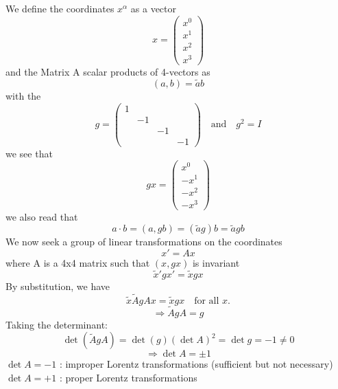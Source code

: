 \documentclass{article}
\begin{document}
	We define the coordinates $x^\alpha$ as a vector
	\[
	x = \begin{pmatrix} x^0 \\ x^1 \\ x^2 \\ x^3 \end{pmatrix}
	\]
	and the Matrix A scalar products of 4-vectors as
	\[
	(a, b) = \tilde{a}b
	\]
	with the
	\[
	g = \begin{pmatrix} 1 & & & \\ & -1 & & \\ & & -1 & \\ & & & -1 \end{pmatrix}
	\quad \text{and} \quad g^2 = I
	\]
	we see that
	\[
	gx = \begin{pmatrix} x^0 \\ -x^1 \\ -x^2 \\ -x^3 \end{pmatrix}
	\]
	we also read that
	\[
	a \cdot b = (a, gb) = (\tilde{a}g)b = \tilde{a}gb
	\]
	We now seek a group of linear transformations on the coordinates
	\[
	x' = Ax
	\]
	where A is a 4x4 matrix such that $(x, gx)$ is invariant
	\[
	\tilde{x}'g x' = \tilde{x}gx
	\]
	By substitution, we have
	\[
	\tilde{x} \tilde{A} g A x = \tilde{x} g x \quad \text{for all } x.
	\]
	\[
	\Rightarrow \tilde{A} g A = g
	\]
	Taking the determinant:
	\[
	\det(\tilde{A} g A) = \det(g) (\det A)^2 = \det g = -1 \neq 0
	\]
	\[
	\Rightarrow \det A = \pm 1
	\]
	$\det A = -1$ : improper Lorentz transformations (sufficient but not necessary) \\
	$\det A = +1$ : proper Lorentz transformations
	
	\vspace{1cm}
	
\end{document}
